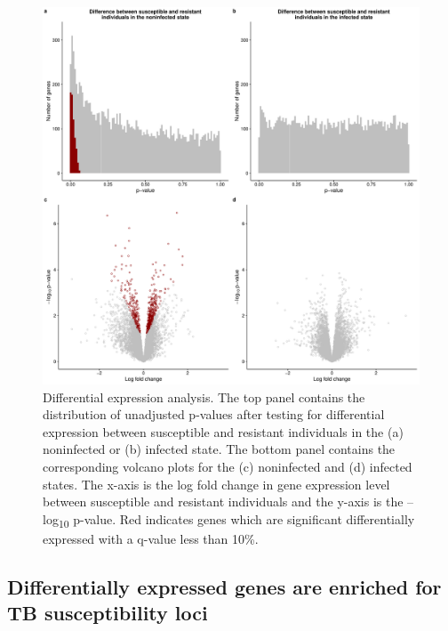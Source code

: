 \documentclass[fleqn,10pt]{wlscirep}
\begin{document}
\begin{figure}[p]
\centering
\includegraphics[width=\linewidth]{../figure/limma.pdf}
\caption{
Differential expression analysis. The top panel contains the
distribution of unadjusted p-values after testing for differential
expression between susceptible and resistant individuals in the (a)
noninfected or (b) infected state. The bottom panel contains the
corresponding volcano plots for the (c) noninfected and (d) infected
states. The x-axis is the log fold change in gene expression level
between susceptible and resistant individuals and the y-axis is the
–log\textsubscript{10} p-value. Red indicates genes which are
significant differentially expressed with a q-value less than 10\%.
}
\label{fig:limma}
\end{figure}
\subsection*{Differentially expressed genes are enriched for TB susceptibility loci}
\end{document}
